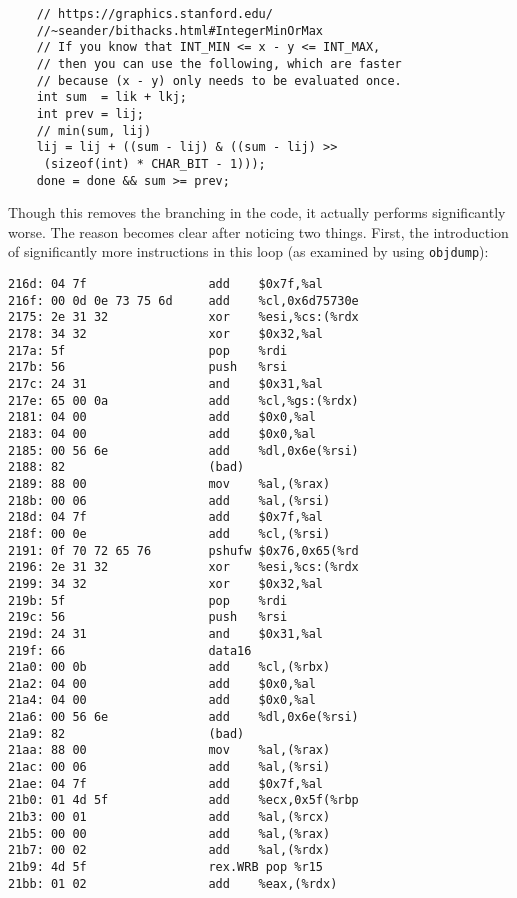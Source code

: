 \documentclass[11pt]{article}
\begin{document}
\begin{lstlisting}
    // https://graphics.stanford.edu/
    //~seander/bithacks.html#IntegerMinOrMax
    // If you know that INT_MIN <= x - y <= INT_MAX,
    // then you can use the following, which are faster
    // because (x - y) only needs to be evaluated once.
    int sum  = lik + lkj;
    int prev = lij;
    // min(sum, lij)
    lij = lij + ((sum - lij) & ((sum - lij) >>
     (sizeof(int) * CHAR_BIT - 1)));
    done = done && sum >= prev;
\end{lstlisting}

\noindent Though this removes the branching in the code, it actually performs significantly worse.  The reason becomes clear after noticing two things.  First, the introduction of significantly more instructions in this loop (as examined by using \texttt{objdump}):

\begin{lstlisting}
216d: 04 7f                 add    $0x7f,%al
216f: 00 0d 0e 73 75 6d     add    %cl,0x6d75730e
2175: 2e 31 32              xor    %esi,%cs:(%rdx
2178: 34 32                 xor    $0x32,%al
217a: 5f                    pop    %rdi
217b: 56                    push   %rsi
217c: 24 31                 and    $0x31,%al
217e: 65 00 0a              add    %cl,%gs:(%rdx)
2181: 04 00                 add    $0x0,%al
2183: 04 00                 add    $0x0,%al
2185: 00 56 6e              add    %dl,0x6e(%rsi)
2188: 82                    (bad)
2189: 88 00                 mov    %al,(%rax)
218b: 00 06                 add    %al,(%rsi)
218d: 04 7f                 add    $0x7f,%al
218f: 00 0e                 add    %cl,(%rsi)
2191: 0f 70 72 65 76        pshufw $0x76,0x65(%rd
2196: 2e 31 32              xor    %esi,%cs:(%rdx
2199: 34 32                 xor    $0x32,%al
219b: 5f                    pop    %rdi
219c: 56                    push   %rsi
219d: 24 31                 and    $0x31,%al
219f: 66                    data16
21a0: 00 0b                 add    %cl,(%rbx)
21a2: 04 00                 add    $0x0,%al
21a4: 04 00                 add    $0x0,%al
21a6: 00 56 6e              add    %dl,0x6e(%rsi)
21a9: 82                    (bad)
21aa: 88 00                 mov    %al,(%rax)
21ac: 00 06                 add    %al,(%rsi)
21ae: 04 7f                 add    $0x7f,%al
21b0: 01 4d 5f              add    %ecx,0x5f(%rbp
21b3: 00 01                 add    %al,(%rcx)
21b5: 00 00                 add    %al,(%rax)
21b7: 00 02                 add    %al,(%rdx)
21b9: 4d 5f                 rex.WRB pop %r15
21bb: 01 02                 add    %eax,(%rdx)
\end{lstlisting}
\end{document}

